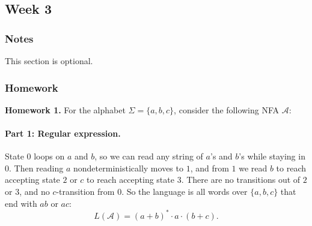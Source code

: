 \documentclass{article}
\theoremstyle{theorem}
\theoremstyle{definition}
\theoremstyle{remark}
\begin{document}
\subsection{Week 3}

\subsubsection{Notes}

This section is optional. 

\subsubsection{Homework}

\textbf{Homework 1.}
For the alphabet $\Sigma = \{a,b,c\}$, consider the following NFA $\mathcal{A}$:

\begin{center}
\end{center}

\paragraph{Part 1: Regular expression.}
State $0$ loops on $a$ and $b$, so we can read any string of $a$'s and $b$'s while staying in $0$. Then reading $a$ nondeterministically moves to $1$, and from $1$ we read $b$ to reach accepting state $2$ or $c$ to reach accepting state $3$. There are no transitions out of $2$ or $3$, and no $c$-transition from $0$. So the language is all words over $\{a,b,c\}$ that end with $ab$ or $ac$:
\[
  L(\mathcal{A}) = (a+b)^*\cdot a \cdot (b+c).
\]
\end{document}
